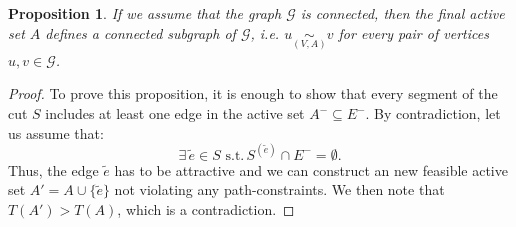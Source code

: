 \documentclass[12pt]{article}
\newcommand\TODO[1]{\fbox{\textcolor{red}{TODO: #1}}}
\newtheorem{prop}{Proposition}[section]
\begin{document}
\begin{prop} \label{prop:A_connected}
If we assume that the graph $\mathcal{G}$ is connected, then the final active set $A$ defines a connected subgraph of $\mathcal{G}$, i.e. $u \underset{(V,A)}{\sim}v$ for every pair of vertices $u,v \in \mathcal{G}$. 
\end{prop}
\begin{proof}
To prove this proposition, it is enough to show that every segment of the cut $S$ includes at least one edge in the active set $A^- \subseteq E^-$. 
By contradiction, let us assume that:
\begin{equation}
\exists \, \tilde{e} \in S \,\, \mathrm{s.t.} \, S^{(\tilde{e})}\cap E^- = \emptyset.
\end{equation}
Thus, the edge $\tilde{e}$ has to be attractive and we can construct an new feasible active set $A'= A \cup \{\tilde{e}\}$ not violating any path-constraints. We then note that $T(A')>T(A)$, which is a contradiction. 

\TODO{Add more details...}
\end{proof}
\end{document}
